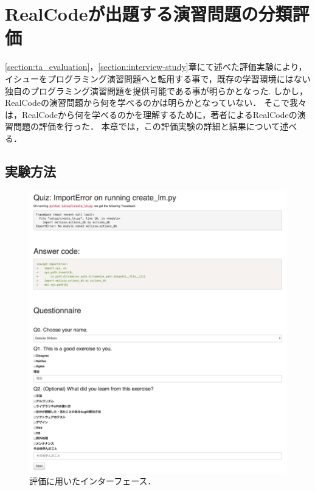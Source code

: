 
\chapter{RealCodeが出題する演習問題の分類評価}
\label{section:lab-study}
\graphicspath{{Chapters_evaluation/Figs/}}


\ref{section:ta_evaluation}，\ref{section:interview-study}章にて述べた評価実験により，イシューをプログラミング演習問題へと転用する事で，既存の学習環境にはない独自のプログラミング演習問題を提供可能である事が明らかとなった.
しかし，RealCodeの演習問題から何を学べるのかは明らかとなっていない．
そこで我々は，RealCodeから何を学べるのかを理解するために，著者によるRealCodeの演習問題の評価を行った．
本章では，この評価実験の詳細と結果について述べる．


\section{実験方法}

\begin{figure}[t]
	\centering
  \includegraphics[width=1.0\columnwidth]{20181218-lab-study-interface-all.png}
  \caption{評価に用いたインターフェース．}
  \label{fig:lab-study}
\end{figure}

